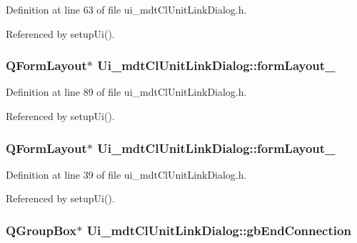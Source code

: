 Definition at line 63 of file ui\-\_\-mdt\-Cl\-Unit\-Link\-Dialog.\-h.



Referenced by setup\-Ui().

\hypertarget{class_ui__mdt_cl_unit_link_dialog_afbcb186f7a974287674edfccdbbb06b3}{
\subsubsection[{form\-Layout\-\_\-5}]{\setlength{\rightskip}{0pt plus 5cm}Q\-Form\-Layout$\ast$ Ui\-\_\-mdt\-Cl\-Unit\-Link\-Dialog\-::form\-Layout\-\_}}\label{class_ui__mdt_cl_unit_link_dialog_afbcb186f7a974287674edfccdbbb06b3}


Definition at line 89 of file ui\-\_\-mdt\-Cl\-Unit\-Link\-Dialog.\-h.



Referenced by setup\-Ui().

\hypertarget{class_ui__mdt_cl_unit_link_dialog_a9b4ea9a53fb5d2ff39af58223f668e46}{
\subsubsection[{form\-Layout\-\_\-6}]{\setlength{\rightskip}{0pt plus 5cm}Q\-Form\-Layout$\ast$ Ui\-\_\-mdt\-Cl\-Unit\-Link\-Dialog\-::form\-Layout\-\_}}\label{class_ui__mdt_cl_unit_link_dialog_a9b4ea9a53fb5d2ff39af58223f668e46}


Definition at line 39 of file ui\-\_\-mdt\-Cl\-Unit\-Link\-Dialog.\-h.



Referenced by setup\-Ui().

\hypertarget{class_ui__mdt_cl_unit_link_dialog_a5e6c24c5ad56b20b8289749c906ccc65}{
\subsubsection[{gb\-End\-Connection}]{\setlength{\rightskip}{0pt plus 5cm}Q\-Group\-Box$\ast$ Ui\-\_\-mdt\-Cl\-Unit\-Link\-Dialog\-::gb\-End\-Connection}}\label{class_ui__mdt_cl_unit_link_dialog_a5e6c24c5ad56b20b8289749c906ccc65}


